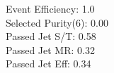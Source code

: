 Event Efficiency:   1.0\\ 
Selected Purity(6): 0.00\\ 
Passed Jet S/T:     0.58\\ 
Passed Jet MR:      0.32\\ 
Passed Jet Eff:     0.34